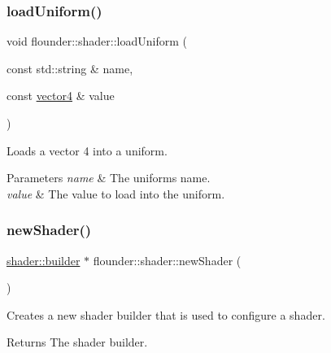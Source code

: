 \subsubsection{\texorpdfstring{load\+Uniform()}{loadUniform()}\hspace{0.1cm}{\footnotesize\ttfamily [13/13]}}
{\footnotesize\ttfamily void flounder\+::shader\+::load\+Uniform (\begin{DoxyParamCaption}\item[{const std\+::string \&}]{name,  }\item[{const \hyperlink{classflounder_1_1vector4}{vector4} \&}]{value }\end{DoxyParamCaption})}



Loads a vector 4 into a uniform. 


\begin{DoxyParams}{Parameters}
{\em name} & The uniforms name. \\
\hline
{\em value} & The value to load into the uniform. \\
\hline
\end{DoxyParams}
\mbox{\label{classflounder_1_1shader_a3dbe598a9994e8e4ccbf889ba38b05f7}} 
\subsubsection{\texorpdfstring{new\+Shader()}{newShader()}}
{\footnotesize\ttfamily \hyperlink{classflounder_1_1shader_1_1builder}{shader\+::builder} $\ast$ flounder\+::shader\+::new\+Shader (\begin{DoxyParamCaption}{ }\end{DoxyParamCaption})\hspace{0.3cm}{\ttfamily [static]}}



Creates a new shader builder that is used to configure a shader. 

\begin{DoxyReturn}{Returns}
The shader builder. 
\end{DoxyReturn}
\mbox{\label{classflounder_1_1shader_a4b1f6770ce28db4f9a4b20e0842d785e}} 
